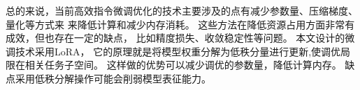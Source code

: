 \documentclass[11pt]{article}
\begin{document}
    
总的来说，当前高效指令微调优化的技术主要涉及的点有减少参数量、压缩梯度、量化等方式来
来降低计算和减少内存消耗。
这些方法在降低资源占用方面非常有成效，但也存在一定的缺点，
比如精度损失、收敛稳定性等问题。 本文设计的微调技术采用LoRA， 它的原理就是将模型权重分解为低秩分量进行更新,使调优局限在相关任务子空间。
这样做的优势可以减少调优的参数量，降低计算内存。 缺点采用低秩分解操作可能会削弱模型表征能力。
    
\end{document}
